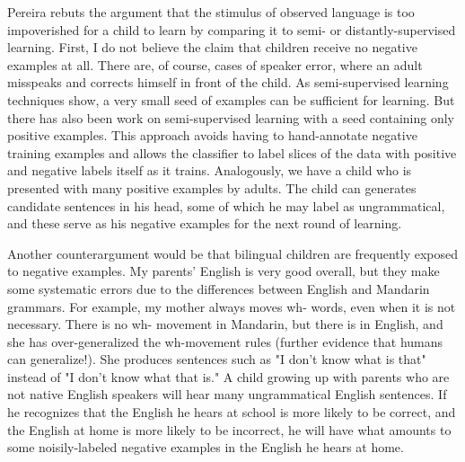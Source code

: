 \documentclass[paper=a4, fontsize=11pt]{scrartcl} %
\begin{document}
Pereira rebuts the argument that the stimulus of observed language is too impoverished for a child to learn by comparing it to semi- or distantly-supervised learning.  First, I do not believe the claim that children receive no negative examples at all.  There are, of course, cases of speaker error, where an adult misspeaks and corrects himself in front of the child.  As semi-supervised learning techniques show, a very small seed of examples can be sufficient for learning.  But there has also been work on semi-supervised learning with a seed containing only positive examples.  This approach avoids having to hand-annotate negative training examples and allows the classifier to label slices of the data with positive and negative labels itself as it trains.  Analogously, we have a child who is presented with many positive examples by adults.  The child can generates candidate sentences in his head, some of which he may label as ungrammatical, and these serve as his negative examples for the next round of learning.  

Another counterargument would be that bilingual children are frequently exposed to negative examples.  My parents' English is very good overall, but they make some systematic errors due to the differences between English and Mandarin grammars.  For example, my mother always moves wh- words, even when it is not necessary.  There is no wh- movement in Mandarin, but there is in English, and she has over-generalized the wh-movement rules (further evidence that humans can generalize!).  She produces sentences such as "I don't know what is that" instead of "I don't know what that is."  A child growing up with parents who are not native English speakers will hear many ungrammatical English sentences.  If he recognizes that the English he hears at school is more likely to be correct, and the English at home is more likely to be incorrect, he will have what amounts to some noisily-labeled negative examples in the English he hears at home. 
\end{document}
